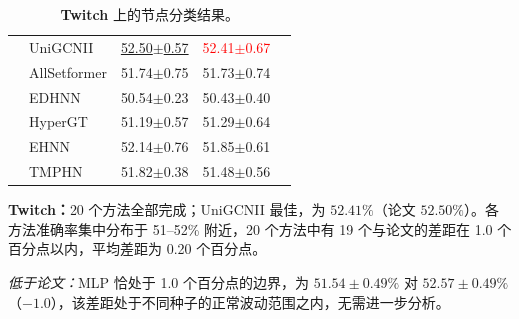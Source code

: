 \documentclass[11pt,a4paper]{article}
\begin{document}
\begin{table}[H]
\begin{tabular}{llccc}
		 & UniGCNII          & \underline{52.50$\pm$0.57}   & \textcolor{red}{52.41$\pm$0.67}   &  \\
		 & AllSetformer      & 51.74$\pm$0.75   & 51.73$\pm$0.74   &  \\
		 & EDHNN             & 50.54$\pm$0.23   & 50.43$\pm$0.40   &  \\
		 & HyperGT           & 51.19$\pm$0.57   & 51.29$\pm$0.64   &  \\
		 & EHNN              & 52.14$\pm$0.76   & 51.85$\pm$0.61   &  \\
		 & TMPHN             & 51.82$\pm$0.38   & 51.48$\pm$0.56   &  \\
		\bottomrule
	\end{tabular}
	\caption{\textbf{Twitch} 上的节点分类结果。}
\end{table}

\par\smallskip
\noindent\textbf{Twitch：}20 个方法全部完成；UniGCNII 最佳，为 $52.41\%$（论文 $52.50\%$）。各方法准确率集中分布于 51--52\% 附近，20 个方法中有 19 个与论文的差距在 1.0 个百分点以内，平均差距为 0.20 个百分点。

\noindent\textit{低于论文：}MLP 恰处于 1.0 个百分点的边界，为 $51.54\pm0.49\%$ 对 $52.57\pm0.49\%$（$-1.0$），该差距处于不同种子的正常波动范围之内，无需进一步分析。
\end{document}
